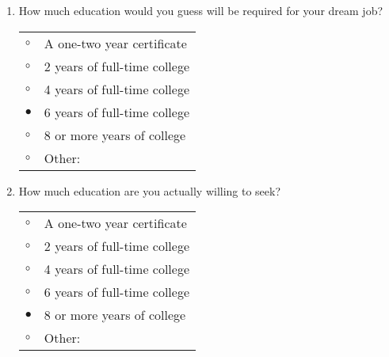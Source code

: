 \documentclass{article}
\begin{document}
\begin{enumerate}
\item How much education would you guess will be required for your dream job?\\

\begin{tabular}{l l}
    $\circ$ & A one-two year certificate\\
    $\circ$ & 2 years of full-time college\\
    $\circ$  & 4 years of full-time college\\
    $\bullet$ & 6 years of full-time college\\
    $\circ$ & 8 or more years of college\\
    $\circ$ & Other:\\
\end{tabular}


\item How much education are you actually willing to seek?\\

\begin{tabular}{l l}
    $\circ$ & A one-two year certificate\\
    $\circ$ & 2 years of full-time college\\
    $\circ$  & 4 years of full-time college\\
    $\circ$ & 6 years of full-time college\\
    $\bullet$ & 8 or more years of college\\
    $\circ$ & Other:\\
\end{tabular}

\end{enumerate}
\end{document}
